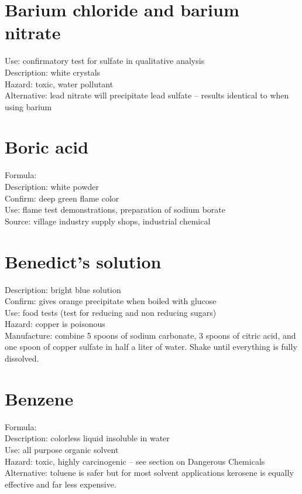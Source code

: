 \section{Barium chloride and barium nitrate}
\label{sec:}
Use: confirmatory test for sulfate in qualitative analysis\\
Description: white crystals\\
Hazard: toxic, 
water pollutant\\
Alternative: lead nitrate will precipitate lead sulfate -- 
results identical to when using barium

\section{Boric acid}
\label{sec:}
Formula: \\
Description: white powder\\
Confirm: deep green flame color\\
Use: flame test demonstrations, preparation of sodium borate\\
Source: village industry supply shops, industrial chemical

\section{Benedict's solution}
\label{sec:benedict}
Description: bright blue solution\\
Confirm: gives orange precipitate when boiled with glucose\\
Use: food tests (test for reducing and non reducing sugars)\\
Hazard: copper is poisonous\\
Manufacture: combine 5 spoons of sodium carbonate, 
3 spoons of citric acid, 
and one spoon of copper sulfate in half a liter of water. 
Shake until everything is fully dissolved.

\section{Benzene}
\label{sec:}
Formula: \\
Description: colorless liquid insoluble in water\\
Use: all purpose organic solvent\\
Hazard: toxic, 
highly carcinogenic -- see section on Dangerous Chemicals\\
Alternative: toluene is safer but for most solvent applications 
kerosene is equally effective and far less expensive.

